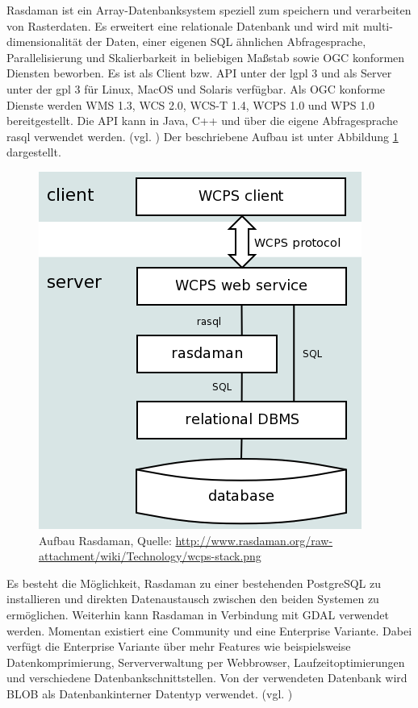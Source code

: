 Rasdaman ist ein Array-Datenbanksystem speziell zum speichern und verarbeiten von Rasterdaten.
Es erweitert eine relationale Datenbank und wird mit  multi-dimensionalität der Daten, einer eigenen SQL ähnlichen Abfragesprache, Parallelisierung und Skalierbarkeit in beliebigen Maßstab sowie OGC konformen Diensten beworben.
Es ist als Client bzw. API unter der \Gls{lgpl} 3 und als Server unter der \Gls{gpl} 3 für Linux, MacOS und Solaris verfügbar.
Als OGC konforme Dienste werden WMS 1.3, WCS 2.0, WCS-T 1.4, WCPS 1.0 und WPS 1.0 bereitgestellt.
Die API kann in Java, C++ und über die eigene Abfragesprache rasql verwendet werden. (vgl. \cite{website:rasdamanogeo})
Der beschriebene Aufbau ist unter Abbildung \ref{fig:rasdaman} dargestellt.
\begin{figure}[h!]
\centering
\includegraphics[width=.4\textwidth]{Abbildungen/rasdaman-aufbau.png}
\caption[Aufbau Rasdaman]{Aufbau Rasdaman, Quelle: \url{http://www.rasdaman.org/raw-attachment/wiki/Technology/wcps-stack.png}}
\label{fig:rasdaman}
\end{figure}

Es besteht die Möglichkeit, Rasdaman zu einer bestehenden PostgreSQL zu installieren und direkten Datenaustausch zwischen den beiden Systemen zu ermöglichen.
Weiterhin kann Rasdaman in Verbindung mit GDAL verwendet werden.
Momentan existiert eine Community und eine Enterprise Variante. Dabei verfügt die Enterprise Variante über mehr Features wie beispielsweise Datenkomprimierung, Serververwaltung per Webbrowser, Laufzeitoptimierungen und verschiedene Datenbankschnittstellen.
Von der verwendeten Datenbank wird BLOB als Datenbankinterner Datentyp verwendet. (vgl. \cite{website:rasdamanowiki})